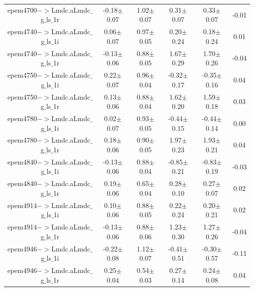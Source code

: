 \begin{table}[h]
{\begin{tabular}{cccccc}
        epem4700$->$Lmdc.aLmdc$\_$g$\_$ls$\_$1r & -0.18$\pm$0.07 & 1.02$\pm$0.07 & 0.31$\pm$0.07 & 0.33$\pm$0.07 & -0.01 \\
        epem4740$->$Lmdc.aLmdc$\_$g$\_$ls$\_$1i & 0.06$\pm$0.07 & 0.97$\pm$0.05 & 0.20$\pm$0.24 & 0.18$\pm$0.24 & 0.01 \\
        epem4740$->$Lmdc.aLmdc$\_$g$\_$ls$\_$1r & -0.13$\pm$0.06 & 0.88$\pm$0.05 & 1.67$\pm$0.29 & 1.70$\pm$0.26 & -0.04 \\
        epem4750$->$Lmdc.aLmdc$\_$g$\_$ls$\_$1i & 0.22$\pm$0.07 & 0.96$\pm$0.04 & -0.32$\pm$0.17 & -0.35$\pm$0.16 & 0.04 \\
        epem4750$->$Lmdc.aLmdc$\_$g$\_$ls$\_$1r & 0.13$\pm$0.06 & 0.88$\pm$0.04 & 1.62$\pm$0.20 & 1.59$\pm$0.18 & 0.03 \\
        epem4780$->$Lmdc.aLmdc$\_$g$\_$ls$\_$1i & 0.02$\pm$0.07 & 0.93$\pm$0.05 & -0.44$\pm$0.15 & -0.44$\pm$0.14 & 0.00 \\
        epem4780$->$Lmdc.aLmdc$\_$g$\_$ls$\_$1r & 0.18$\pm$0.06 & 0.90$\pm$0.05 & 1.97$\pm$0.23 & 1.93$\pm$0.21 & 0.04 \\
        epem4840$->$Lmdc.aLmdc$\_$g$\_$ls$\_$1i & -0.13$\pm$0.06 & 0.88$\pm$0.04 & -0.85$\pm$0.21 & -0.83$\pm$0.19 & -0.03 \\
        epem4840$->$Lmdc.aLmdc$\_$g$\_$ls$\_$1r & 0.19$\pm$0.06 & 0.65$\pm$0.04 & 0.28$\pm$0.10 & 0.27$\pm$0.07 & 0.02 \\
        epem4914$->$Lmdc.aLmdc$\_$g$\_$ls$\_$1i & 0.10$\pm$0.06 & 0.88$\pm$0.05 & 0.22$\pm$0.24 & 0.20$\pm$0.21 & 0.02 \\
        epem4914$->$Lmdc.aLmdc$\_$g$\_$ls$\_$1r & -0.13$\pm$0.06 & 0.88$\pm$0.06 & 1.23$\pm$0.30 & 1.27$\pm$0.26 & -0.04 \\
        epem4946$->$Lmdc.aLmdc$\_$g$\_$ls$\_$1i & -0.22$\pm$0.08 & 1.12$\pm$0.07 & -0.41$\pm$0.51 & -0.30$\pm$0.57 & -0.11 \\
        epem4946$->$Lmdc.aLmdc$\_$g$\_$ls$\_$1r & 0.25$\pm$0.04 & 0.54$\pm$0.03 & 0.27$\pm$0.14 & 0.24$\pm$0.08 & 0.04 \\
        \hline\hline
        \end{tabular}
        }
\end{table}